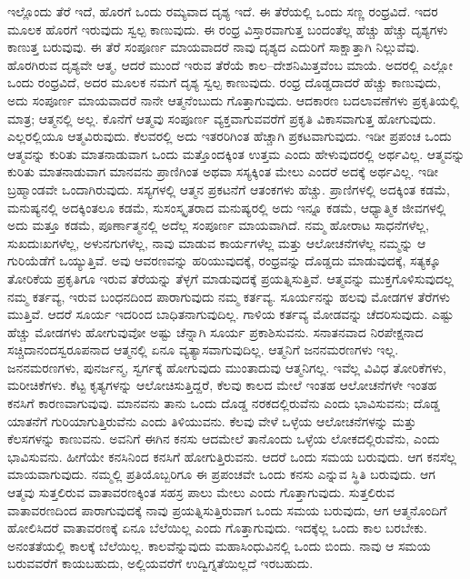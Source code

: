 ಇಲ್ಲೊಂದು ತೆರೆ ಇದೆ, ಹೊರಗೆ ಒಂದು ರಮ್ಯವಾದ ದೃಶ್ಯ ಇದೆ. ಈ ತೆರೆಯಲ್ಲಿ ಒಂದು ಸಣ್ಣ ರಂಧ್ರವಿದೆ. ಇದರ ಮೂಲಕ ಹೊರಗೆ ಇರುವುದು ಸ್ವಲ್ಪ ಕಾಣುವುದು. ಈ ರಂಧ್ರ ವಿಸ್ತಾರವಾಗುತ್ತ ಬಂದಂತೆಲ್ಲ ಹೆಚ್ಚು ಹೆಚ್ಚು ದೃಶ್ಯಗಳು ಕಾಣುತ್ತ ಬರುವುವು. ಈ ತೆರೆ ಸಂಪೂರ್ಣ ಮಾಯವಾದರೆ ನಾವು ದೃಶ್ಯದ ಎದುರಿಗೆ ಸಾಕ್ಷಾತ್ತಾಗಿ ನಿಲ್ಲುವೆವು. ಹೊರಗಿರುವ ದೃಶ್ಯವೇ ಆತ್ಮ, ಆದರೆ ಮುಂದೆ ಇರುವ ತೆರೆಯೆ ಕಾಲ–ದೇಶನಿಮಿತ್ತವೆಂಬ ಮಾಯೆ. ಅದರಲ್ಲಿ ಎಲ್ಲೋ ಒಂದು ರಂಧ್ರವಿದೆ, ಅದರ ಮೂಲಕ ನಮಗೆ ದೃಶ್ಯ ಸ್ವಲ್ಪ ಕಾಣುವುದು. ರಂಧ್ರ ದೊಡ್ಡದಾದರೆ ಹೆಚ್ಚು ಕಾಣುವುದು, ಅದು ಸಂಪೂರ್ಣ ಮಾಯವಾದರೆ ನಾನೇ ಆತ್ಮನೆಂಬುದು ಗೊತ್ತಾಗುವುದು. ಆದಕಾರಣ ಬದಲಾವಣೆಗಳು ಪ್ರಕೃತಿಯಲ್ಲಿ ಮಾತ್ರ; ಆತ್ಮನಲ್ಲಿ ಅಲ್ಲ. ಕೊನೆಗೆ ಆತ್ಮವು ಸಂಪೂರ್ಣ ವ್ಯಕ್ತವಾಗುವವರೆಗೆ ಪ್ರಕೃತಿ ವಿಕಾಸವಾಗುತ್ತ ಹೋಗುವುದು. ಎಲ್ಲರಲ್ಲಿಯೂ ಆತ್ಮವಿರುವುದು. ಕೆಲವರಲ್ಲಿ ಅದು ಇತರರಿಗಿಂತ ಹೆಚ್ಚಾಗಿ ಪ್ರಕಟವಾಗುವುದು. ಇಡೀ ಪ್ರಪಂಚ ಒಂದು ಆತ್ಮವನ್ನು ಕುರಿತು ಮಾತನಾಡುವಾಗ ಒಂದು ಮತ್ತೊಂದಕ್ಕಿಂತ ಉತ್ತಮ ಎಂದು ಹೇಳುವುದರಲ್ಲಿ ಅರ್ಥವಿಲ್ಲ. ಆತ್ಮವನ್ನು ಕುರಿತು ಮಾತನಾಡುವಾಗ ಮಾನವನು ಪ್ರಾಣಿಗಿಂತ ಅಥವಾ ಸಸ್ಯಕ್ಕಿಂತ ಮೇಲು ಎಂದರೆ ಅದಕ್ಕೆ ಅರ್ಥವಿಲ್ಲ. ಇಡೀ ಬ್ರಹ್ಮಾಂಡವೇ ಒಂದಾಗಿರುವುದು. ಸಸ್ಯಗಳಲ್ಲಿ ಆತ್ಮನ ಪ್ರಕಟನೆಗೆ ಆತಂಕಗಳು ಹೆಚ್ಚು. ಪ್ರಾಣಿಗಳಲ್ಲಿ ಅದಕ್ಕಿಂತ ಕಡಮೆ, ಮನುಷ್ಯನಲ್ಲಿ ಅದಕ್ಕಿಂತಲೂ ಕಡಮೆ, ಸುಸಂಸ್ಕೃತರಾದ ಮನುಷ್ಯರಲ್ಲಿ ಅದು ಇನ್ನೂ ಕಡಮೆ, ಆಧ್ಯಾತ್ಮಿಕ ಜೀವಗಳಲ್ಲಿ ಅದು ಮತ್ತೂ ಕಡಮೆ, ಪೂರ್ಣಾತ್ಮನಲ್ಲಿ ಅದೆಲ್ಲ ಸಂಪೂರ್ಣ ಮಾಯವಾಗಿದೆ. ನಮ್ಮ ಹೋರಾಟ ಸಾಧನೆಗಳೆಲ್ಲ, ಸುಖದುಃಖಗಳೆಲ್ಲ, ಅಳುನಗುಗಳೆಲ್ಲ, ನಾವು ಮಾಡುವ ಕಾರ್ಯಗಳೆಲ್ಲ ಮತ್ತು ಆಲೋಚನೆಗಳೆಲ್ಲ ನಮ್ಮನ್ನು ಆ ಗುರಿಯೆಡೆಗೆ ಒಯ್ಯುತ್ತಿವೆ. ಅವು ಆವರಣವನ್ನು ಹರಿಯುವುದಕ್ಕೆ, ರಂಧ್ರವನ್ನು ದೊಡ್ಡದು ಮಾಡುವುದಕ್ಕೆ, ಸತ್ಯಕ್ಕೂ ತೋರಿಕೆಯ ಪ್ರಕೃತಿಗೂ ಇರುವ ತೆರೆಯನ್ನು ತೆಳ್ಳಗೆ ಮಾಡುವುದಕ್ಕೆ ಪ್ರಯತ್ನಿಸುತ್ತಿವೆ. ಆತ್ಮವನ್ನು ಮುಕ್ತಗೊಳಿಸುವುದಲ್ಲ ನಮ್ಮ ಕರ್ತವ್ಯ, ಇರುವ ಬಂಧನದಿಂದ ಪಾರಾಗುವುದು ನಮ್ಮ ಕರ್ತವ್ಯ. ಸೂರ್ಯನನ್ನು ಹಲವು ಮೋಡಗಳ ತೆರೆಗಳು ಮುತ್ತಿವೆ. ಆದರೆ ಸೂರ್ಯ ಇದರಿಂದ ಬಾಧಿತನಾಗುವುದಿಲ್ಲ. ಗಾಳಿಯ ಕರ್ತವ್ಯ ಮೋಡವನ್ನು ಚೆದರಿಸುವುದು. ಎಷ್ಟು ಹೆಚ್ಚು ಮೋಡಗಳು ಹೋಗುವುವೋ ಅಷ್ಟು ಚೆನ್ನಾಗಿ ಸೂರ್ಯ ಪ್ರಕಾಶಿಸುವನು. ಸನಾತನವಾದ ನಿರಪೇಕ್ಷನಾದ ಸಚ್ಚಿದಾನಂದಸ್ವರೂಪನಾದ ಆತ್ಮನಲ್ಲಿ ಏನೂ ವ್ಯತ್ಯಾಸವಾಗುವುದಿಲ್ಲ. ಆತ್ಮನಿಗೆ ಜನನಮರಣಗಳು ಇಲ್ಲ. ಜನನಮರಣಗಳು, ಪುನರ್ಜನ್ಮ, ಸ್ವರ್ಗಕ್ಕೆ ಹೋಗುವುದು ಮುಂತಾದುವು ಆತ್ಮನಿಗಲ್ಲ. ಇವೆಲ್ಲ ವಿವಿಧ ತೋರಿಕೆಗಳು, ಮರೀಚಿಕೆಗಳು. ಕೆಟ್ಟ ಕೃತ್ಯಗಳನ್ನು ಆಲೋಚಿಸುತ್ತಿದ್ದರೆ, ಕೆಲವು ಕಾಲದ ಮೇಲೆ ಇಂತಹ ಆಲೋಚನೆಗಳೇ ಇಂತಹ ಕನಸಿಗೆ ಕಾರಣವಾಗುವುವು. ಮಾನವನು ತಾನು ಒಂದು ದೊಡ್ಡ ನರಕದಲ್ಲಿರುವೆನು ಎಂದು ಭಾವಿಸುವನು; ದೊಡ್ಡ ಯಾತನೆಗೆ ಗುರಿಯಾಗುತ್ತಿರುವೆನು ಎಂದು ತಿಳಿಯುವನು. ಕೆಲವು ವೇಳೆ ಒಳ್ಳೆಯ ಆಲೋಚನೆಗಳನ್ನು ಮತ್ತು ಕೆಲಸಗಳನ್ನು ಕಾಣುವನು. ಅವನಿಗೆ ಈಗಿನ ಕನಸು ಆದಮೇಲೆ ತಾನೊಂದು ಒಳ್ಳೆಯ ಲೋಕದಲ್ಲಿರುವೆನು, ಎಂದು ಭಾವಿಸುವನು. ಹೀಗೆಯೇ ಕನಸಿನಿಂದ ಕನಸಿಗೆ ಹೋಗುತ್ತಿರುವನು. ಆದರೆ ಒಂದು ಸಮಯ ಬರುವುದು. ಆಗ ಕನಸೆಲ್ಲ ಮಾಯವಾಗುವುದು. ನಮ್ಮಲ್ಲಿ ಪ್ರತಿಯೊಬ್ಬರಿಗೂ ಈ ಪ್ರಪಂಚವೇ ಒಂದು ಕನಸು ಎನ್ನುವ ಸ್ಥಿತಿ ಬರುವುದು. ಆಗ ಆತ್ಮವು ಸುತ್ತಲಿರುವ ವಾತಾವರಣಕ್ಕಿಂತ ಸಹಸ್ರ ಪಾಲು ಮೇಲು ಎಂದು ಗೊತ್ತಾಗುವುದು. ಸುತ್ತಲಿರುವ ವಾತಾವರಣದಿಂದ ಪಾರಾಗುವುದಕ್ಕೆ ನಾವು ಪ್ರಯತ್ನಿಸುತ್ತಿರುವಾಗ ಒಂದು ಸಮಯ ಬರುವುದು, ಆಗ ಆತ್ಮನೊಂದಿಗೆ ಹೋಲಿಸಿದರೆ ವಾತಾವರಣಕ್ಕೆ ಏನೂ ಬೆಲೆಯಿಲ್ಲ ಎಂದು ಗೊತ್ತಾಗುವುದು. ಇದಕ್ಕೆಲ್ಲ ಒಂದು ಕಾಲ ಬರಬೇಕು. ಅನಂತತೆಯಲ್ಲಿ ಕಾಲಕ್ಕೆ ಬೆಲೆಯಿಲ್ಲ. ಕಾಲವೆನ್ನುವುದು ಮಹಾಸಿಂಧುವಿನಲ್ಲಿ ಒಂದು ಬಿಂದು. ನಾವು ಆ ಸಮಯ ಬರುವವರೆಗೆ ಕಾಯಬಹುದು, ಅಲ್ಲಿಯವರೆಗೆ ಉದ್ವಿಗ್ನತೆಯಿಲ್ಲದೆ ಇರಬಹುದು.

